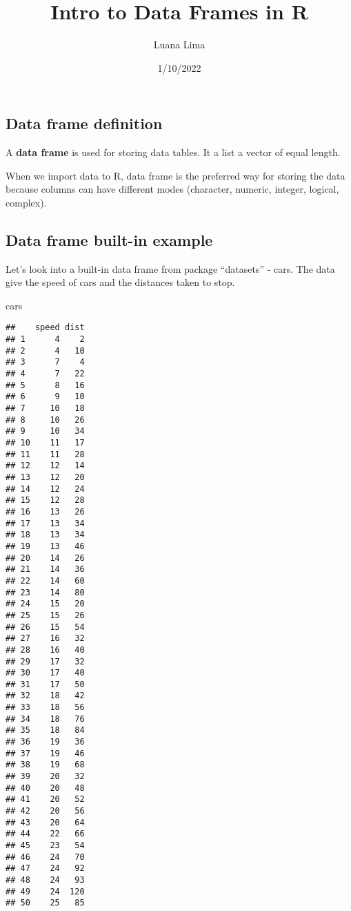\documentclass[
]{article}
\title{Intro to Data Frames in R}
\author{Luana Lima}
\date{1/10/2022}
\newenvironment{Shaded}{\begin{snugshade}}{\end{snugshade}}
\newcommand{\NormalTok}[1]{#1}
\begin{document}
\maketitle

\hypertarget{data-frame-definition}{%
\subsection{Data frame definition}\label{data-frame-definition}}

A \textbf{data frame} is used for storing data tables. It a list a
vector of equal length.

When we import data to R, data frame is the preferred way for storing
the data because columns can have different modes (character, numeric,
integer, logical, complex).

\hypertarget{data-frame-built-in-example}{%
\subsection{Data frame built-in
example}\label{data-frame-built-in-example}}

Let's look into a built-in data frame from package ``datasets'' - cars.
The data give the speed of cars and the distances taken to stop.

\begin{Shaded}
\begin{Highlighting}[]
\NormalTok{cars}
\end{Highlighting}
\end{Shaded}

\begin{verbatim}
##    speed dist
## 1      4    2
## 2      4   10
## 3      7    4
## 4      7   22
## 5      8   16
## 6      9   10
## 7     10   18
## 8     10   26
## 9     10   34
## 10    11   17
## 11    11   28
## 12    12   14
## 13    12   20
## 14    12   24
## 15    12   28
## 16    13   26
## 17    13   34
## 18    13   34
## 19    13   46
## 20    14   26
## 21    14   36
## 22    14   60
## 23    14   80
## 24    15   20
## 25    15   26
## 26    15   54
## 27    16   32
## 28    16   40
## 29    17   32
## 30    17   40
## 31    17   50
## 32    18   42
## 33    18   56
## 34    18   76
## 35    18   84
## 36    19   36
## 37    19   46
## 38    19   68
## 39    20   32
## 40    20   48
## 41    20   52
## 42    20   56
## 43    20   64
## 44    22   66
## 45    23   54
## 46    24   70
## 47    24   92
## 48    24   93
## 49    24  120
## 50    25   85
\end{verbatim}
\end{document}
